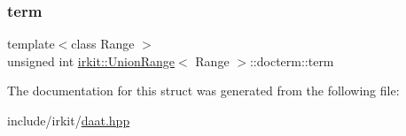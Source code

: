 \subsubsection{\texorpdfstring{term}{term}}
{\footnotesize\ttfamily template$<$class Range $>$ \\
unsigned int \hyperlink{classirkit_1_1UnionRange}{irkit\+::\+Union\+Range}$<$ Range $>$\+::docterm\+::term}



The documentation for this struct was generated from the following file\+:\begin{DoxyCompactItemize}
\item 
include/irkit/\hyperlink{daat_8hpp}{daat.\+hpp}\end{DoxyCompactItemize}
